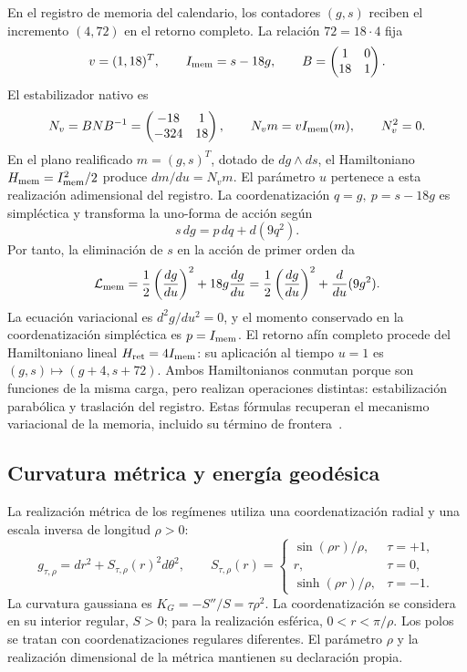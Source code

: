 En el registro de memoria del calendario, los contadores \((g,s)\)
reciben el incremento \((4,72)\) en el retorno completo. La relación
\(72=18\cdot4\) fija
\[
 v=(1,18)^T,\qquad I_{\rm mem}=s-18g,
 \qquad B=\begin{pmatrix}1&0\\18&1\end{pmatrix}.
\]
El estabilizador nativo es
\begin{equation}
 N_v=BNB^{-1}=
 \begin{pmatrix}-18&1\\-324&18\end{pmatrix},\qquad
 N_vm=vI_{\rm mem}(m),\qquad N_v^2=0.
 \label{eq:hc-nv}
\end{equation}
En el plano realificado \(m=(g,s)^T\), dotado de \(dg\wedge ds\),
el Hamiltoniano \(H_{\rm mem}=I_{\rm mem}^2/2\) produce
\(dm/du=N_vm\). El parámetro \(u\) pertenece a esta realización
adimensional del registro. La coordenatización
\(q=g,\ p=s-18g\) es simpléctica y transforma la uno-forma de acción
según
\begin{equation}
 s\,dg=p\,dq+d(9q^2).
 \label{eq:hc-memoria-borde}
\end{equation}
Por tanto, la eliminación de \(s\) en la acción de primer orden da
\begin{equation}
 \mathcal L_{\rm mem}
 =\frac12\left(\frac{dg}{du}\right)^2
 +18g\frac{dg}{du}
 =\frac12\left(\frac{dg}{du}\right)^2
 +\frac{d}{du}(9g^2).
 \label{eq:hc-lmem}
\end{equation}
La ecuación variacional es \(d^2g/du^2=0\), y el momento
conservado en la coordenatización simpléctica es \(p=I_{\rm mem}\).
El retorno afín completo procede del Hamiltoniano lineal
\(H_{\rm ret}=4I_{\rm mem}\): su aplicación al tiempo \(u=1\)
es \((g,s)\mapsto(g+4,s+72)\). Ambos Hamiltonianos conmutan
porque son funciones de la misma carga, pero realizan operaciones
distintas: estabilización parabólica y traslación del registro.
Estas fórmulas recuperan el mecanismo variacional de la memoria, incluido
su término de frontera~\cite{hmtX}.

\subsection{Curvatura métrica y energía geodésica}

La realización métrica de los regímenes utiliza una coordenatización radial y una
escala inversa de longitud \(\rho>0\):
\begin{equation}
 g_{\tau,\rho}=dr^2+S_{\tau,\rho}(r)^2d\theta^2,
 \qquad
 S_{\tau,\rho}(r)=
 \begin{cases}
 \sin(\rho r)/\rho,&\tau=+1,\\
 r,&\tau=0,\\
 \sinh(\rho r)/\rho,&\tau=-1.
 \end{cases}
 \label{eq:hc-metrique}
\end{equation}
La curvatura gaussiana es \(K_G=-S''/S=\tau\rho^2\).
La coordenatización se considera en su interior regular, \(S>0\); para la
realización esférica, \(0<r<\pi/\rho\). Los polos se tratan con
coordenatizaciones regulares diferentes. El parámetro \(\rho\) y la realización
dimensional de la métrica mantienen su declaración propia.

